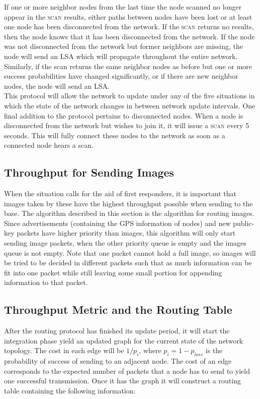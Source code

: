 \documentclass[letterpaper]{article}
\begin{document}
\noindent If one or more neighbor nodes from the last time the node scanned no longer appear in 
the \textsc{scan} results, either paths between nodes have been lost or at least one node has
been disconnected from the network. If the \textsc{scan} returns no results, then the node knows
that it has been disconnected from the network. If the node was not disconnected from the network
but former neighbors are missing, the node will send an LSA which will propagate throughout the
entire network. Similarly, if the scan returns the same neighbor nodes as before but one or more
success probabilities have changed significantly, or if there are new neighbor nodes, the node will
send an LSA.
\\

\noindent This protocol will allow the network to update under any of the five situations in which
the state of the network changes in between network update intervals. One final addition to the
protocol pertains to disconnected nodes. When a node is disconnected from the network but wishes to
join it, it will issue a \textsc{scan} every 5 seconds. This will fully connect these nodes to the
network as soon as a connected node hears a scan. 

\subsection{Throughput for Sending Images}

When the situation calls for the aid of first responders, it is important that images taken by these have the highest throughput possible when sending to the base. The algorithm described in this section is the algorithm for routing images. Since advertisements (containing the GPS information of nodes) and new public-key packets have higher priority than images, this algorithm will only start sending image packets, when the other priority queue is empty and the images queue is not empty. Note that one packet cannot hold a full image, so images will be tried to be decided in different packets such that as much information can be fit into one packet while still leaving some small portion for appending information to that packet.

\subsection{Throughput Metric and the Routing Table}

After the routing protocol has finished its update period, it will start the integration phase yield an updated graph for the current state of the network topology. The cost in each edge will be $1/p_{i}$, where $p_{i} = 1 - p_{loss}$ is the probability of success of sending to an adjacent node. The cost of an edge corresponds to the expected number of packets that a node has to send to yield one successful transmission. Once it has the graph it will construct a routing table containing the following information:
\end{document}
